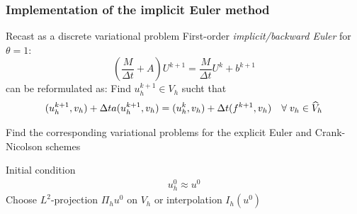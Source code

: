 \begin{frame}
  \frametitle{Implementation of the implicit Euler method}
  
  \begin{block}{Recast as a discrete variational problem}
    First-order \emph{implicit/backward Euler} for $\theta = 1$:
    \begin{equation*}
      (\dfrac{M}{\Delta t} + A)U^{k+1}
      =  \dfrac{M}{\Delta t}U^k +  b^{k+1}
    \end{equation*}
    can be reformulated as:
    Find $u_{h}^{k+1} \in V_h$ sucht that
    \begin{align*}
      (u_{h}^{k+1}, v_h) + \Delta t a(u_{h}^{k+1},v_h) 
      =  (u_{h}^{k}, v_h) + \Delta t (f^{k+1},v_h)
      \quad \forall \; v_h \in \widehat{V}_h
    \end{align*}
  \end{block}
   Find the corresponding variational problems
  for the explicit Euler and Crank-Nicolson schemes
  \begin{block}{Initial condition}
    \vspace{-2em}
    \begin{align*}
      u_{h}^0 \approx u^0
    \end{align*}
    Choose $L^2$-projection $\Pi_h u^0$ on $V_h$ or interpolation $I_h(u^0)$
  \end{block}
\end{frame}

